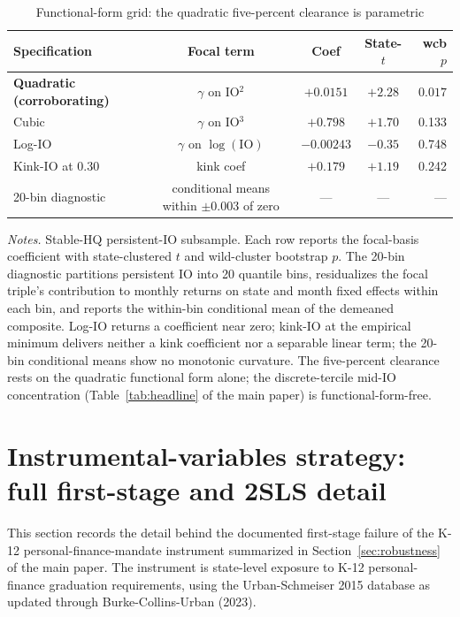 \documentclass[12pt]{article}
\begin{document}
\begin{table}[h]
\centering
\caption{Functional-form grid: the quadratic five-percent clearance is parametric}
\label{tab:formgrid_ia}
\footnotesize
\begin{tabular}{lcccr}
\toprule
Specification & Focal term & Coef & State-$t$ & wcb $p$ \\
\midrule
\textbf{Quadratic (corroborating)} & $\gamma$ on IO$^{2}$ & $\mathbf{+0.0151}$ & $\mathbf{+2.28}$ & $\mathbf{0.017}$ \\
Cubic & $\gamma$ on IO$^{3}$ & $+0.798$ & $+1.70$ & 0.133 \\
Log-IO & $\gamma$ on $\log(\mathrm{IO})$ & $-0.00243$ & $-0.35$ & 0.748 \\
Kink-IO at 0.30 & kink coef & $+0.179$ & $+1.19$ & 0.242 \\
20-bin diagnostic & conditional means within $\pm 0.003$ of zero & --- & --- & --- \\
\bottomrule
\end{tabular}

\medskip
{\footnotesize\textit{Notes.} Stable-HQ persistent-IO subsample. Each row reports the focal-basis coefficient with state-clustered $t$ and wild-cluster bootstrap $p$. The 20-bin diagnostic partitions persistent IO into 20 quantile bins, residualizes the focal triple's contribution to monthly returns on state and month fixed effects within each bin, and reports the within-bin conditional mean of the demeaned composite. Log-IO returns a coefficient near zero; kink-IO at the empirical minimum delivers neither a kink coefficient nor a separable linear term; the 20-bin conditional means show no monotonic curvature. The five-percent clearance rests on the quadratic functional form alone; the discrete-tercile mid-IO concentration (Table~\ref{tab:headline} of the main paper) is functional-form-free.}
\end{table}

\section{Instrumental-variables strategy: full first-stage and 2SLS detail}
\label{ia:ivfirststage}

This section records the detail behind the documented first-stage failure of the K-12 personal-finance-mandate instrument summarized in Section~\ref{sec:robustness} of the main paper. The instrument is state-level exposure to K-12 personal-finance graduation requirements, using the Urban-Schmeiser 2015 database as updated through Burke-Collins-Urban (2023).
\end{document}
